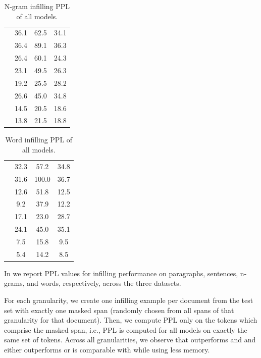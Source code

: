 \begin{table}[t]
    \centering
    \begin{tabular}[t]{lccc}
        \toprule
            & \sto{}   & \abs{}   & \lyr{} \\
        \midrule
\lmscratch{} & 36.1 & 62.5 & 34.1 \\
\lmrevscratch{} & 36.4 & 89.1 & 36.3 \\
\lmallscratch{} & 26.4 & 60.1 & 24.3 \\
\ilmscratch{} & 23.1 & 49.5 & 26.3 \\
\lm{} & 19.2 & 25.5 & 28.2 \\
\lmrev{} & 26.6 & 45.0 & 34.8 \\
\lmall{} & 14.5 & 20.5 & 18.6 \\
\ilm{} & 13.8 & 21.5 & 18.8 \\
        \bottomrule
    \end{tabular}
    \caption{N-gram infilling PPL of all models.}
    \label{tab:granu_ppl_ngrams}
\end{table}

\begin{table}[t]
    \centering
    \begin{tabular}[t]{lccc}
        \toprule
            & \sto{}   & \abs{}   & \lyr{} \\
        \midrule
\lmscratch{} & 32.3 & 57.2 & 34.8 \\
\lmrevscratch{} & 31.6 & 100.0 & 36.7 \\
\lmallscratch{} & 12.6 & 51.8 & 12.5 \\
\ilmscratch{} & 9.2 & 37.9 & 12.2 \\
\lm{} & 17.1 & 23.0 & 28.7 \\
\lmrev{} & 24.1 & 45.0 & 35.1 \\
\lmall{} & 7.5 & 15.8 & 9.5 \\
\ilm{} & 5.4 & 14.2 & 8.5 \\
        \bottomrule
    \end{tabular}
    \caption{Word infilling PPL of all models.}
    \label{tab:granu_ppl_words}
\end{table}


In  we report PPL values for infilling performance on paragraphs, sentences, n-grams, and words, respectively, across the three datasets. 

For each granularity, we create one infilling example per document from the test set with exactly one masked span (randomly chosen from all spans of that granularity for that document).
Then, we compute PPL only on the tokens which comprise the masked span, i.e., PPL is computed for all models on exactly the same set of tokens.
Across all granularities, we observe that \ilm{} outperforms \lm{} and \lmrev{} and either outperforms or is comparable with \lmall{} while using less memory.

